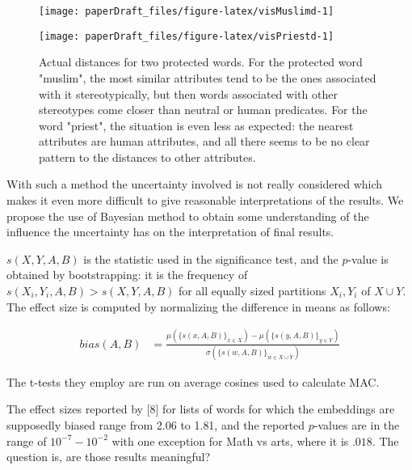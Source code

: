 \documentclass[
  12pt,
  dvipsnames,enabledeprecatedfontcommands]{scrartcl}
\begin{document}
\begin{figure}[H]

\begin{center}\texttt{[image: paperDraft\_files/figure-latex/visMuslimd-1]} \end{center}





\begin{center}\texttt{[image: paperDraft\_files/figure-latex/visPriestd-1]} \end{center}

\caption{Actual distances for two protected words. For the protected word "muslim", the most similar attributes tend to be the ones associated with it stereotypically, but then words associated with other stereotypes come closer than neutral or human predicates. For the word "priest", the situation is even less as expected: the nearest attributes are human attributes, and all there seems to be no clear pattern to the distances to other attributes.}
\end{figure}

With such a method the uncertainty involved is not really considered
which makes it even more difficult to give reasonable interpretations of
the results. We propose the use of Bayesian method to obtain some
understanding of the influence the uncertainty has on the interpretation
of final results.

\noindent \(s(X,Y,A,B)\) is the statistic used in the significance test,
and the \(p\)-value is obtained by bootstrapping: it is the frequency of
\(s(X_i,Y_i,A,B)>s(X,Y,A,B)\) for all equally sized partitions
\(X_i, Y_i\) of \(X\cup Y\). The effect size is computed by normalizing
the difference in means as follows:

\vspace{-2mm}

\footnotesize

\begin{align}
bias(A,B) & = \frac{
\mu(\{s(x,A,B)\}_{x\in X}) -\mu(\{s(y,A,B)\}_{y\in Y}) 
}{
\sigma(\{s(w,A,B)\}_{w\in X\cup Y})
}
\end{align}

\normalsize

The t-tests they employ are run on average cosines used to calculate
\textsf{MAC}.

The effect sizes reported by {[}8{]} for lists of words for which the
embeddings are supposedly biased range from 2.06 to 1.81, and the
reported \(p\)-values are in the range of \(10^{-7}-10^{-2}\) with one
exception for Math vs arts, where it is \(.018\). The question is, are
those results meaningful?
\end{document}
